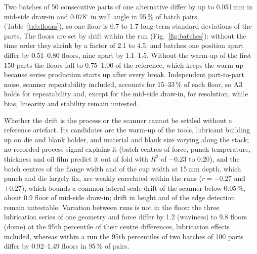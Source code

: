 \documentclass[pdflatex,sn-basic,lineno]{sn-jnl}
\begin{document}
Two batches of 50 consecutive parts of one alternative differ by up to 0.051\,mm in mid-side draw-in and 0.078$^\circ$ in wall angle in 95\,\% of batch pairs (Table~\ref{tab:floors}), so one floor is 0.7 to 1.7 long-term standard deviations of the parts. The floors are set by drift within the run (Fig.~\ref{fig:batches}): without the time order they shrink by a factor of 2.1 to 4.5, and batches one position apart differ by 0.51--0.80 floors, nine apart by 1.1--1.5. Without the warm-up of the first 150 parts the floors fall to 0.75--1.00 of the reference, which keeps the warm-up because series production starts up after every break. Independent part-to-part noise, scanner repeatability included, accounts for 15--33\,\% of each floor, so A3 holds for repeatability and, except for the mid-side draw-in, for resolution, while bias, linearity and stability remain untested.

Whether the drift is the process or the scanner cannot be settled without a reference artefact. Its candidates are the warm-up of the tools, lubricant building up on die and blank holder, and material and blank size varying along the stack; no recorded process signal explains it (batch centres of force, punch temperature, thickness and oil film predict it out of fold with $R^2$ of $-0.23$ to $0.20$), and the batch centres of the flange width and of the cup width at 15\,mm depth, which punch and die largely fix, are weakly correlated within the runs ($r=-0.27$ and $+0.27$), which bounds a common lateral scale drift of the scanner below 0.05\,\%, about 0.9 floor of mid-side draw-in; drift in height and of the edge detection remain untestable. Variation between runs is not in the floor: the three lubrication series of one geometry and force differ by 1.2 (waviness) to 9.8 floors (dome) at the 95th percentile of their centre differences, lubrication effects included, whereas within a run the 95th percentiles of two batches of 100 parts differ by 0.92--1.49 floors in 95\,\% of pairs.
\end{document}
